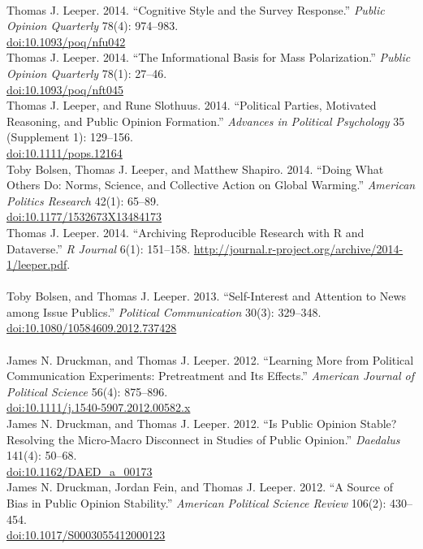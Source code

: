\documentclass[12pt]{article}
\newcommand{\topic}[1]{\pagebreak[3]\indent {\color{lg}{\footnotesize #1 }}\\}
\newcommand{\entry}[1]{\indent {\color{lg}\guillemotright}\hspace{2pt}#1\vspace{.25em}\\}
\begin{document}
\topic{Peer-Reviewed Publications: 2014}
	\entry{Thomas J. Leeper. 2014. ``Cognitive Style and the Survey Response.'' \textit{Public Opinion Quarterly} 78(4): 974--983.\\ \href{http://doi.org/10.1093/poq/nfu042}{doi:10.1093/poq/nfu042}}
	\entry{Thomas J. Leeper. 2014. ``The Informational Basis for Mass Polarization.'' \textit{Public Opinion Quarterly} 78(1): 27--46.\\ \href{http://doi.org/10.1093/poq/nft045}{doi:10.1093/poq/nft045}}
	\entry{Thomas J. Leeper, and Rune Slothuus. 2014. ``Political Parties, Motivated Reasoning, and Public Opinion Formation.'' \textit{Advances in Political Psychology} 35 (Supplement 1): 129--156.\\ \href{http://doi.org/10.1111/pops.12164}{doi:10.1111/pops.12164}}
	\entry{Toby Bolsen, Thomas J. Leeper, and Matthew Shapiro. 2014. ``Doing What Others Do: Norms, Science, and Collective Action on Global Warming.'' \textit{American Politics Research} 42(1): 65--89.\\ \href{http://doi.org/10.1177/1532673X13484173}{doi:10.1177/1532673X13484173}}
	\entry{Thomas J. Leeper. 2014. ``Archiving Reproducible Research with R and Dataverse.'' \textit{R Journal} 6(1): 151--158. \href{http://journal.r-project.org/archive/2014-1/leeper.pdf}{http://journal.r-project.org/archive/2014-1/leeper.pdf}.}

\topic{Peer-Reviewed Publications: 2013}
	\entry{Toby Bolsen, and Thomas J. Leeper. 2013. ``Self-Interest and Attention to News among Issue Publics.'' \textit{Political Communication} 30(3): 329--348.\\ \href{http://doi.org/10.1080/10584609.2012.737428}{doi:10.1080/10584609.2012.737428}}

\topic{Peer-Reviewed Publications: 2012}
	\entry{James N. Druckman, and Thomas J. Leeper. 2012. ``Learning More from Political Communication Experiments: Pretreatment and Its Effects.'' \textit{American Journal of Political Science} 56(4): 875--896.\\ \href{http://doi.org/10.1111/j.1540-5907.2012.00582.x}{doi:10.1111/j.1540-5907.2012.00582.x}}
	\entry{James N. Druckman, and Thomas J. Leeper. 2012. ``Is Public Opinion Stable? Resolving the Micro-Macro Disconnect in Studies of Public Opinion.'' \textit{Daedalus} 141(4): 50--68.\\ \href{http://doi.org/10.1162/DAED\_a\_00173}{doi:10.1162/DAED\_a\_00173}}
	\entry{James N. Druckman, Jordan Fein, and Thomas J. Leeper. 2012. ``A Source of Bias in Public Opinion Stability.'' \textit{American Political Science Review} 106(2): 430--454.\\ \href{http://doi.org/10.1017/S0003055412000123}{doi:10.1017/S0003055412000123}}
\end{document}
